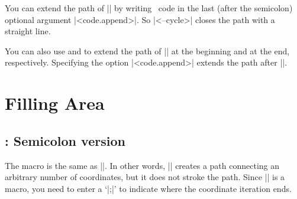 You can extend the path of |\tzlinks| by writing \Tikz\ code in the last (after the semicolon) optional argument |<code.append>|.
So |<--cycle>| closes the path with a straight line.

\begin{tzcode}{.3}
\end{tzcode}

You can also use \icmd{\tzlinksAtBegin} and \icmd{\tzlinksAtEnd} to extend the path of |\tzlinks| at the beginning and at the end, respectively.
Specifying the option |<code.append>| extends the path after |\tzlinksAtEnd|.

\begin{tzcode}{.3}
\end{tzcode}




\chapter{Filling Area}
\label{c:fillingarea}

\section{\protect\cmd{\tzpath}: Semicolon version}
\label{s:tzpath}


The macro \icmd{\tzpath} is the same as |\tzlinks[draw=none]|. In other words, |\tzpath| creates a path connecting an arbitrary number of coordinates, but it does not stroke the path. Since |\tzpath| is a  macro, you need to enter a  `|;|' to indicate where the coordinate iteration ends.

